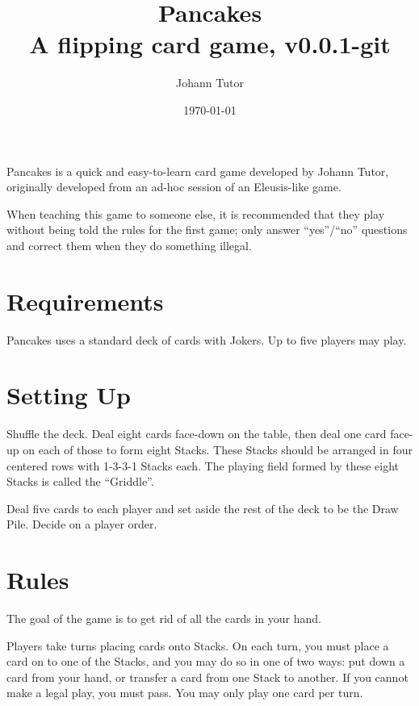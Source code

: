 \documentclass{article}
\newcommand\theversion{0.0.1-git}
\begin{document}
\title{Pancakes\\ \large A flipping card game, v\theversion}
\author{Johann Tutor}
\date{\today}
\maketitle

Pancakes is a quick and easy-to-learn card game developed by Johann Tutor, originally developed from an ad-hoc session of an Eleusis-like game.

When teaching this game to someone else, it is recommended that they play without being told the rules for the first game;
only answer ``yes''/``no'' questions and correct them when they do something illegal.

\tableofcontents

\newpage

\section{Requirements}

Pancakes uses a standard deck of cards with Jokers.
Up to five players may play.

\section{Setting Up}
\label{sec:setup}

Shuffle the deck. Deal eight cards face-down on the table, then deal one card face-up on each of those to form eight Stacks.
These Stacks should be arranged in four centered rows with 1-3-3-1 Stacks each.
The playing field formed by these eight Stacks is called the ``Griddle''.

Deal five cards to each player and set aside the rest of the deck to be the Draw Pile. Decide on a player order.

\section{Rules}

The goal of the game is to get rid of all the cards in your hand.

Players take turns placing cards onto Stacks. On each turn, you must place a card on to one of the Stacks, and you may do so in one of two ways: put down a card from your hand, or transfer a card from one Stack to another. If you cannot make a legal play, you must pass. You may only play one card per turn.
\end{document}
